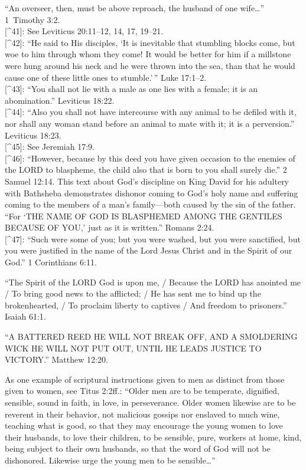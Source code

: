 \documentclass[
]{book}
\begin{document}
``An overseer, then, must be above reproach, the husband of one wife\ldots{}'' 1~Timothy 3:2.\\
{[}\^{}41{]}: See Leviticus 20:11--12, 14, 17, 19--21.\\
{[}\^{}42{]}: ``He said to His disciples, `It is inevitable that stumbling blocks come, but woe to him through whom they come! It would be better for him if a millstone were hung around his neck and he were thrown into the sea, than that he would cause one of these little ones to stumble.'\,'' Luke 17:1--2.\\
{[}\^{}43{]}: ``You shall not lie with a male as one lies with a female; it is an abomination.'' Leviticus 18:22.\\
{[}\^{}44{]}: ``Also you shall not have intercourse with any animal to be defiled with it, nor shall any woman stand before an animal to mate with it; it is a perversion.'' Leviticus 18:23.\\
{[}\^{}45{]}: See Jeremiah 17:9.\\
{[}\^{}46{]}: ``However, because by this deed you have given occasion to the enemies of the LORD to blaspheme, the child also that is born to you shall surely die.'' 2 Samuel 12:14. This text about God's discipline on King David for his adultery with Bathsheba demonstrates dishonor coming to God's holy name and suffering coming to the members of a man's family---both caused by the sin of the father.
``For `THE NAME OF GOD IS BLASPHEMED AMONG THE GENTILES BECAUSE OF YOU,' just as it is written.'' Romans 2:24.\\
{[}\^{}47{]}: ``Such were some of you; but you were washed, but you were sanctified, but you were justified in the name of the Lord Jesus Christ and in the Spirit of our God.'' 1 Corinthians 6:11.

``The Spirit of the LORD God is upon me, / Because the LORD has anointed me / To bring good news to the afflicted; / He has sent me to bind up the brokenhearted, / To proclaim liberty to captives / And freedom to prisoners.'' Isaiah 61:1.

``A BATTERED REED HE WILL NOT BREAK OFF, AND A SMOLDERING WICK HE WILL NOT PUT OUT, UNTIL HE LEADS JUSTICE TO VICTORY.'' Matthew 12:20.

As one example of scriptural instructions given to men as distinct from those given to women, see Titus 2:2ff.: ``Older men are to be temperate, dignified, sensible, sound in faith, in love, in perseverance. Older women likewise are to be reverent in their behavior, not malicious gossips nor enslaved to much wine, teaching what is good, so that they may encourage the young women to love their husbands, to love their children, to be sensible, pure, workers at home, kind, being subject to their own husbands, so that the word of God will not be dishonored. Likewise urge the young men to be sensible\ldots{}''
\end{document}
